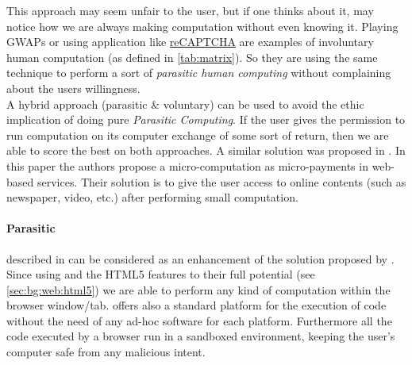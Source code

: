 This approach may seem unfair to the user, but
if one thinks about it, may notice how we are always making computation without even
knowing it. Playing \ac{GWAP}s or using application like
\href{http://www.google.com/recaptcha}{reCAPTCHA}
are examples of involuntary human computation (as defined in \autoref{tab:matrix}). So
they are using the same technique to perform a sort of \emph{parasitic human
computing} without complaining about the users willingness.\\

A hybrid approach (parasitic \& voluntary) can be used to avoid the ethic implication
of doing pure \emph{Parasitic Computing}. If the user gives the permission to
run computation on its computer exchange of some sort of return, then we are
able to score the best on both approaches. A similar solution was proposed in
\cite{karame2011pay}.
In this paper the authors propose a micro-computation as micro-payments in web-based
services. Their solution is to give the user access to online contents (such as
newspaper, video, etc.) after performing small \js{} computation.

\paragraph{Parasitic \js{}} described in \cite{jenkin2008parasitic} can be
considered as an enhancement of the solution proposed by \cite{barabasi2001parasitic}.
Since using \js{} and the HTML5 features to their full potential (see
\ref{sec:bg:web:html5}) we are able to perform any kind of computation
within the browser window/tab. \js{} offers also a standard platform for the
execution of code without the need of any ad-hoc software for each platform.
Furthermore all the code executed by a browser run in a sandboxed environment,
keeping the user's computer safe from any malicious intent.